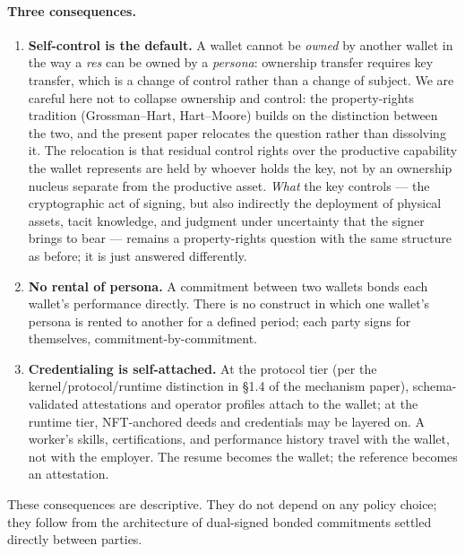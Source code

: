 \documentclass[11pt,a4paper]{article}
\theoremstyle{remark}
\begin{document}
\paragraph{Three consequences.}
\begin{enumerate}[label=(\alph*)]
  \item \textbf{Self-control is the default.} A wallet cannot be
    \emph{owned} by another wallet in the way a \emph{res} can be
    owned by a \emph{persona}: ownership transfer requires key
    transfer, which is a change of control rather than a change of
    subject. We are careful here not to collapse ownership and
    control: the property-rights tradition (Grossman--Hart, Hart--Moore)
    builds on the distinction between the two, and the present
    paper relocates the question rather than dissolving it. The
    relocation is that residual control rights over the productive
    capability the wallet represents are held by whoever holds the
    key, not by an ownership nucleus separate from the productive
    asset. \emph{What} the key controls --- the cryptographic act
    of signing, but also indirectly the deployment of physical
    assets, tacit knowledge, and judgment under uncertainty that
    the signer brings to bear --- remains a property-rights
    question with the same structure as before; it is just answered
    differently.
  \item \textbf{No rental of persona.} A commitment between two
    wallets bonds each wallet's performance directly. There is no
    construct in which one wallet's persona is rented to another
    for a defined period; each party signs for themselves,
    commitment-by-commitment.
  \item \textbf{Credentialing is self-attached.} At the protocol
    tier (per the kernel/protocol/runtime distinction
    in §1.4 of the mechanism paper), schema-validated
    attestations and operator profiles attach to the wallet; at
    the runtime tier, NFT-anchored deeds and credentials may be
    layered on. A worker's skills, certifications, and
    performance history travel with the wallet, not with the
    employer. The resume becomes the wallet; the reference becomes
    an attestation.
\end{enumerate}

These consequences are descriptive. They do not depend on any
policy choice; they follow from the architecture of dual-signed
bonded commitments settled directly between parties.
\end{document}
